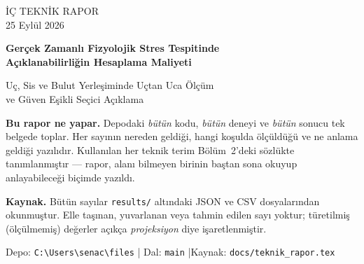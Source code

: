 \documentclass[11pt,a4paper]{report}
\newcommand{\kod}[1]{\texttt{\small #1}}
\newcommand{\dosya}[1]{\texttt{\footnotesize #1}}
\begin{document}
\begin{titlepage}
\centering
\vspace*{2.2cm}

{\sffamily\Large\color{anaRenk} İÇ TEKNİK RAPOR}\\[0.3cm]
{\sffamily\small 25 Eylül 2026}

\vspace{1.8cm}

{\sffamily\huge\bfseries\color{anaRenk}
Gerçek Zamanlı Fizyolojik Stres Tespitinde\\[0.25cm]
Açıklanabilirliğin Hesaplama Maliyeti\par}

\vspace{0.9cm}

{\sffamily\Large
Uç, Sis ve Bulut Yerleşiminde Uçtan Uca Ölçüm\\[0.2cm]
ve Güven Eşikli Seçici Açıklama\par}

\vspace{2.2cm}

\begin{tcolorbox}[width=0.86\textwidth,colback=acikMavi,colframe=anaRenk,
  boxrule=1pt,left=14pt,right=14pt,top=12pt,bottom=12pt]
\sffamily\small
\textbf{Bu rapor ne yapar.} Depodaki \emph{bütün} kodu, \emph{bütün} deneyi ve
\emph{bütün} sonucu tek belgede toplar. Her sayının nereden geldiği, hangi
koşulda ölçüldüğü ve ne anlama geldiği yazılıdır. Kullanılan her teknik terim
Bölüm~2'deki sözlükte tanımlanmıştır --- rapor, alanı bilmeyen birinin baştan
sona okuyup anlayabileceği biçimde yazıldı.

\vspace{0.4em}
\textbf{Kaynak.} Bütün sayılar \dosya{results/} altındaki JSON ve CSV
dosyalarından okunmuştur. Elle taşınan, yuvarlanan veya tahmin edilen sayı
yoktur; türetilmiş (ölçülmemiş) değerler açıkça \emph{projeksiyon} diye
işaretlenmiştir.
\end{tcolorbox}

\vfill
{\sffamily\footnotesize
Depo: \dosya{C:\textbackslash Users\textbackslash senac\textbackslash files} \quad|\quad
Dal: \kod{main} \quad|\quad Kaynak: \dosya{docs/teknik\_rapor.tex}\par}
\end{titlepage}

\tableofcontents
\clearpage

\end{document}
